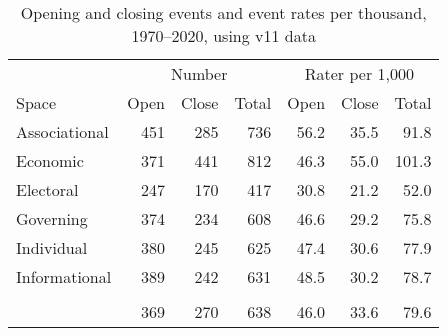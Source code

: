 \begin{table}

\caption{\label{tab:v11-stats}Opening and closing events and event rates per thousand, 1970--2020, using v11 data}
\centering
\begin{tabular}[t]{lrrrrrr}
\toprule
\multicolumn{1}{c}{ } & \multicolumn{3}{c}{Number} & \multicolumn{3}{c}{Rater per 1,000} \\
\cmidrule(l{3pt}r{3pt}){2-4} \cmidrule(l{3pt}r{3pt}){5-7}
Space & Open & Close & Total & Open  & Close  & Total \\
\midrule
Associational & 451 & 285 & 736 & 56.2 & 35.5 & 91.8\\
Economic & 371 & 441 & 812 & 46.3 & 55.0 & 101.3\\
Electoral & 247 & 170 & 417 & 30.8 & 21.2 & 52.0\\
Governing & 374 & 234 & 608 & 46.6 & 29.2 & 75.8\\
Individual & 380 & 245 & 625 & 47.4 & 30.6 & 77.9\\
Informational & 389 & 242 & 631 & 48.5 & 30.2 & 78.7\\
\addlinespace[0.3em]
\multicolumn{7}{l}{\textbf{Average}}\\
\hspace{1em} & 369 & 270 & 638 & 46.0 & 33.6 & 79.6\\
\bottomrule
\end{tabular}
\end{table}
